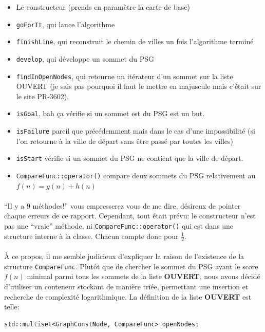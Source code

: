 \documentclass[french]{article}
\begin{document}
\begin{itemize}
	\item Le constructeur (prends en paramètre la carte de base)
	\item \texttt{goForIt}, qui lance l'algorithme
	\item \texttt{finishLine}, qui reconstruit le chemin de villes un fois l'algorithme terminé
	\item \texttt{develop}, qui développe un sommet du PSG
	\item \texttt{findInOpenNodes}, qui retourne un itérateur d'un sommet sur
		la liste OUVERT (je sais pas pourquoi il faut le mettre en majuscule
		mais c'était sur le site PR-3602).
	\item \texttt{isGoal}, bah ça vérifie si un sommet est du PSG est un but.
	\item \texttt{isFailure} pareil que précédemment mais dans le cas d'une
		impossibilité (si l'on retourne à la ville de départ sans être passé
		par toutes les villes)
	\item \texttt{isStart} vérifie si un sommet du PSG ne contient que la ville
		de départ.
	\item \texttt{CompareFunc::operator()} compare deux sommets du PSG
		relativement au $f(n) = g(n) + h(n)$
\end{itemize}

\paragraph{} ``Il y a 9 méthodes!'' vous empresserez vous de me dire, désireux
de pointer chaque erreurs de ce rapport. Cependant, tout était prévu: le
constructeur n'est pas une ``vraie'' méthode, ni
\texttt{CompareFunc::operator()} qui est dans une structure interne à
la classe. Chacun compte donc pour $\frac{1}{2}$.

\paragraph{} À ce propos, il me semble judicieux d'expliquer la raison de
l'existence de la structure \texttt{CompareFunc}. Plutôt que de chercher le
sommet du PSG ayant le score $f(n)$ minimal parmi tous les sommets de la liste
\textbf{OUVERT}, nous avons décidé d'utiliser un conteneur stockant de manière
triée, permettant une insertion et recherche de complexité logarithmique. La
définition de la liste \textbf{\Large{OUVERT}} est telle:

\begin{verbatim}
std::multiset<GraphConstNode, CompareFunc> openNodes;
\end{verbatim}
\end{document}
